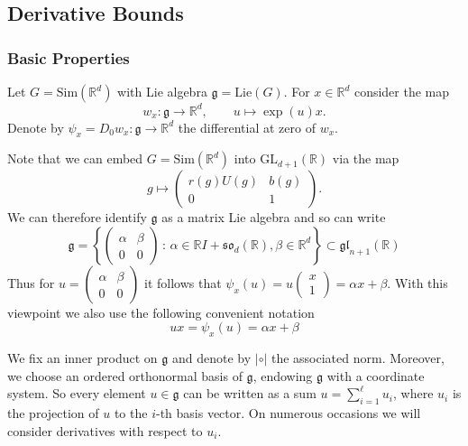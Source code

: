 \documentclass[10pt, english,oneside,reqno]{amsart}
\theoremstyle{plain}
\theoremstyle{remark}
\numberwithin{equation}{section}
\numberwithin{figure}{section}
\newcommand{\R}{\mathbb{R}}
\begin{document}
\subsection{Derivative Bounds}

\label{subsection:DerivativeBounds}

\subsubsection{Basic Properties}

Let $G = \mathrm{Sim}(\R^d)$ with Lie algebra $\mathfrak{g} = \mathrm{Lie}(G)$. For $x \in \R^d$ consider the map $$ w_x: \mathfrak{g} \to \R^d, \quad\quad u \mapsto \exp(u)x.$$ Denote by $\psi_x = D_0w_x : \mathfrak{g} \to \R^d$ the differential at zero of $w_x$. 

Note that we can embed $G = \mathrm{Sim}(\R^d)$ into $\mathrm{GL}_{d + 1}(\R)$ via the map $$g \mapsto \begin{pmatrix}
    r(g)U(g) & b(g) \\ 0 & 1
\end{pmatrix}.$$ We can therefore identify $\mathfrak{g}$ as a matrix Lie algebra and so can write $$\mathfrak{g} = \left\{ \begin{pmatrix}
        \alpha & \beta \\ 0 & 0
    \end{pmatrix}
    \,:\, \alpha\in \R I +   \mathfrak{so}_d(\R), \beta \in \R^d \right\} \subset \mathfrak{gl}_{n + 1}(\R)$$  Thus for $u = (\begin{smallmatrix}
        \alpha & \beta \\ 0 & 0
    \end{smallmatrix})$ it follows that $\psi_x(u) = u(\begin{smallmatrix}
    x \\ 1
\end{smallmatrix}) = \alpha x + \beta$. With this viewpoint we also use the following convenient notation
\begin{equation}\label{NotationConvention}
    ux = \psi_x(u) = \alpha x + \beta
\end{equation}


We fix an inner product on $\mathfrak{g}$ and denote by $|\circ|$ the associated norm. Moreover, we choose an ordered orthonormal basis of $\mathfrak{g}$, endowing $\mathfrak{g}$ with a coordinate system. So every element $u \in \mathfrak{g}$ can be written as a sum $u = \sum_{i = 1}^{\ell} u_i$, where $u_i$ is the projection of $u$ to the $i$-th basis vector. On numerous occasions we will consider derivatives with respect to $u_i$.
\end{document}
